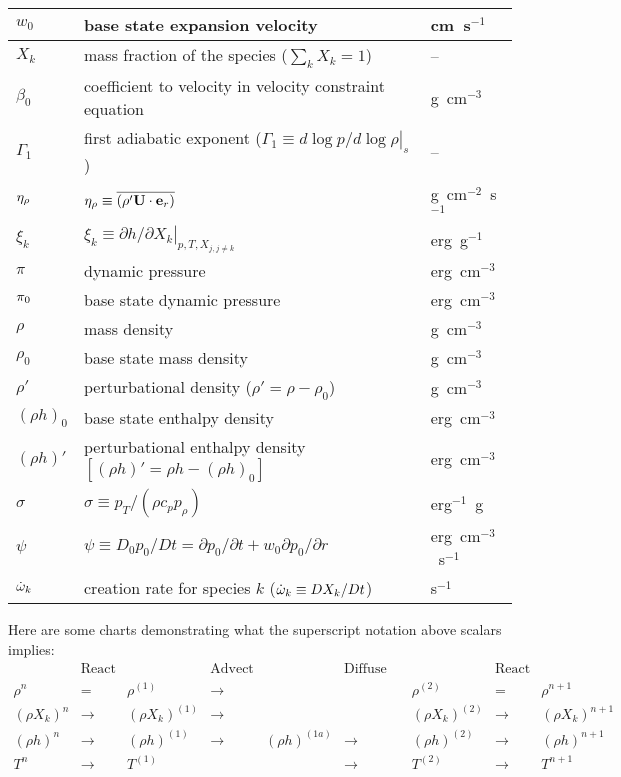 \begin{center}
\begin{longtable}{|l|p{4.0in}|l|}
\hline
$w_0$   & base state expansion velocity              & cm~s$^{-1}$ \\
\hline
$X_k$   & mass fraction of the species ($\sum_k X_k = 1$) & -- \\
\hline
$\beta_0$ & coefficient to velocity
            in velocity constraint equation  & g~cm$^{-3}$ \\
\hline
$\Gamma_1$ & first adiabatic exponent ($\Gamma_1 \equiv \left . d \log p/d \log \rho \right |_s$) & -- \\
\hline
$\eta_{\rho}$ & $\eta_{\rho} \equiv \overline{(\rho' {\bf U} \cdot {\bf e}_r)}$ & g~cm$^{-2}$~s$^{-1}$ \\
\hline
$\xi_k$ & $\xi_k \equiv \left . \partial h / \partial X_k \right |_{p,T,X_{j,j\ne k}}$ & erg~g$^{-1}$ \\
\hline 
$\pi$   & dynamic pressure & erg~cm$^{-3}$ \\
\hline
$\pi_0$ & base state dynamic pressure & erg~cm$^{-3}$ \\
\hline
$\rho$  & mass density  & g~cm$^{-3}$ \\
\hline
$\rho_0$  & base state mass density  & g~cm$^{-3}$ \\
\hline
$\rho'$  & perturbational density ($\rho' = \rho - \rho_0$) & g~cm$^{-3}$ \\
\hline
$(\rho h)_0$ & base state enthalpy density & erg~cm$^{-3}$  \\
\hline
$(\rho h)'$ & perturbational enthalpy density 
              $ \left [(\rho h)' = \rho h - (\rho h)_0 \right ]$ & erg~cm$^{-3}$  \\
\hline
$\sigma$ & $\sigma \equiv p_T/(\rho c_p p_\rho)$ & erg$^{-1}$~g \\
\hline
$\psi$  & $\psi \equiv D_0 p_0/Dt = \partial p_0/\partial t + w_0\partial p_0/\partial r$ & erg~cm$^{-3}$~s$^{-1}$ \\
\hline
$\dot{\omega}_k$ & creation rate for species $k$ ($\dot{\omega}_k \equiv DX_k/Dt$) & s$^{-1}$ \\
\end{longtable}
\end{center}
%
\renewcommand{\arraystretch}{1.0}
Here are some charts demonstrating what the superscript notation above scalars implies:
\begin{equation}
\left.\begin{array}{ccccccccc}
& \text{React State} & & \text{Advect State} & & \text{Diffuse Enthalpy} & & \text{React State} & \\
\rho^n & = & \rho^{(1)} & \longrightarrow & & & \rho^{(2)} & = & \rho^{n+1} \\
(\rho X_k)^n & \longrightarrow & (\rho X_k)^{(1)} & \longrightarrow & & & (\rho X_k)^{(2)} & \longrightarrow & (\rho X_k)^{n+1} \\
(\rho h)^n & \longrightarrow & (\rho h)^{(1)} & \longrightarrow & (\rho h)^{(1a)} & \longrightarrow & (\rho h)^{(2)} & \longrightarrow & (\rho h)^{n+1}\\
T^n & \longrightarrow & T^{(1)} & & & \longrightarrow & T^{(2)} & \longrightarrow & T^{n+1} \\
\end{array}\right.\nonumber
\end{equation}
